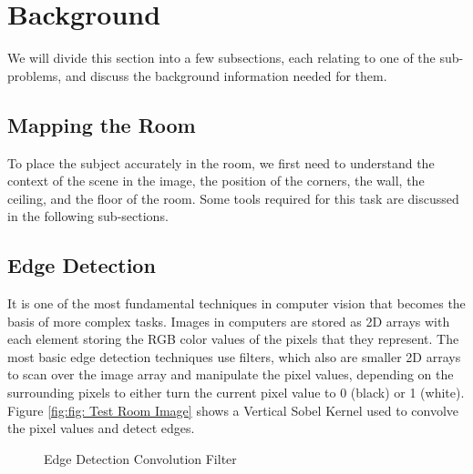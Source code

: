 \documentclass[12pt]{report}
\begin{document}
\section{Background}

We will divide this section into a few subsections, each relating to one of the sub-problems, and discuss the background information needed for them.

\subsection{Mapping the Room}

To place the subject accurately in the room, we first need to understand the context of the scene in the image, the position of the corners, the wall, the ceiling, and the floor of the room. Some tools required for this task are discussed in the following sub-sections.

\subsection{Edge Detection}

It is one of the most fundamental techniques in computer vision that becomes the basis of more complex tasks. Images in computers are stored as 2D arrays with each element storing the RGB color values of the pixels that they represent. The most basic edge detection techniques use filters, which also are smaller 2D arrays to scan over the image array and manipulate the pixel values, depending on the surrounding pixels to either turn the current pixel value to 0 (black) or 1 (white). Figure \ref{fig:fig: Test Room Image} shows a Vertical Sobel Kernel used to convolve the pixel values and detect edges.\newline


\begin{figure}[H]
    \centering
    \caption{Edge Detection Convolution Filter}
    \label{fig:Edge Detection Convolution Filter}
\end{figure}
\end{document}

